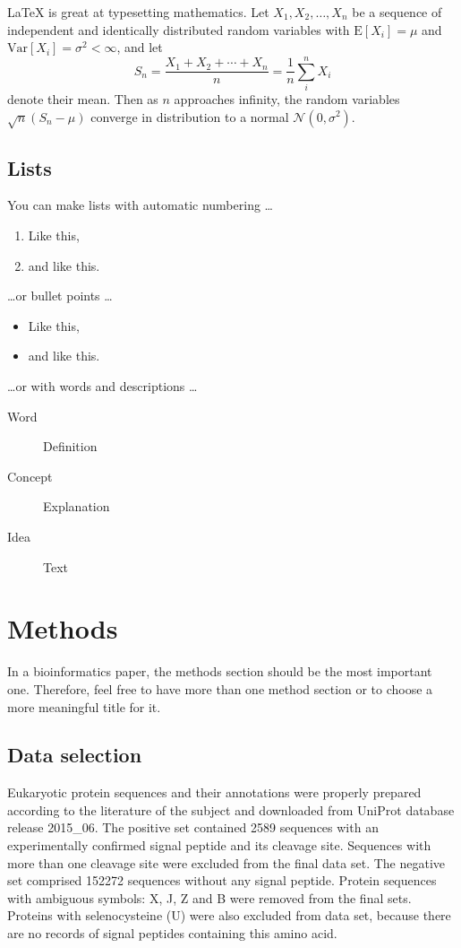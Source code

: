 \documentclass[fleqn,10pt,twoside]{gcb15submission}
\begin{document}
\LaTeX{} is great at typesetting mathematics. Let $X_1, X_2, \ldots, X_n$ be a sequence of independent and identically distributed random variables with $\text{E}[X_i] = \mu$ and $\text{Var}[X_i] = \sigma^2 < \infty$, and let
$$S_n = \frac{X_1 + X_2 + \cdots + X_n}{n}
      = \frac{1}{n}\sum_{i}^{n} X_i$$
denote their mean. Then as $n$ approaches infinity, the random variables $\sqrt{n}(S_n - \mu)$ converge in distribution to a normal $\mathcal{N}(0, \sigma^2)$.

\subsection*{Lists}

You can make lists with automatic numbering \dots

\begin{enumerate}[noitemsep] 
\item Like this,
\item and like this.
\end{enumerate}
\dots or bullet points \dots
\begin{itemize}[noitemsep] 
\item Like this,
\item and like this.
\end{itemize}
\dots or with words and descriptions \dots
\begin{description}
\item[Word] Definition
\item[Concept] Explanation
\item[Idea] Text
\end{description}



\section*{Methods}

In a bioinformatics paper, the methods section should be the most important one.
Therefore, feel free to have more than one method section or to choose a more meaningful title for it.


\subsection*{Data selection}

Eukaryotic protein sequences and their annotations were properly prepared according to the literature of the subject and downloaded from UniProt database release 2015\_06. The positive set contained 2589 sequences with an experimentally confirmed signal peptide and its cleavage site. Sequences with more than one cleavage site were excluded from the final data set. The negative set comprised 152272 sequences without any signal peptide. Protein sequences with ambiguous symbols: X, J, Z and B were removed from the final sets. Proteins with selenocysteine (U) were also excluded from data set, because there are no records of signal peptides containing this amino acid.
\end{document}

